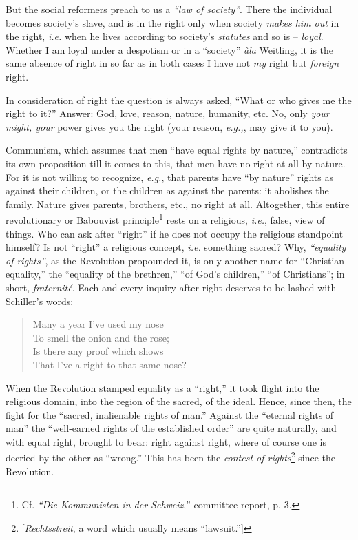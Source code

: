 \documentclass[12pt,a4paper]{book}
\begin{document}
But the social reformers preach to us a \textit{``law of society''}. There 
the individual becomes society's slave, and is in the right only when society 
\textit{makes him out} in the right, \textit{i.e.} when he lives according to 
society's \textit{statutes} and so is -- \textit{loyal}. Whether I am loyal 
under a despotism or in a ``society'' \textit{\`ala} Weitling, it is the 
same absence of right in so far as in both cases I have not \textit{my} right 
but \textit{foreign} right.

In consideration of right the question is always asked, ``What or who gives 
me the right to it?'' Answer: God, love, reason, nature, humanity, etc. No, 
only \textit{your might, your} power gives you the right (your reason, 
\textit{e.g.,}, may give it to you).

Communism, which assumes that men ``have equal rights by nature,'' 
contradicts its own proposition till it comes to this, that men have no right 
at all by nature. For it is not willing to recognize, \textit{e.g.}, that 
parents have ``by nature'' rights as against their children, or the children 
as against the parents: it abolishes the family. Nature gives parents, 
brothers, etc., no right at all. Altogether, this entire revolutionary or 
Babouvist principle\footnote{Cf. \textit{``Die Kommunisten in der 
Schweiz},'' committee report, p. 3.} rests on a religious, \textit{i.e.}, 
false, view of things. Who can ask after ``right'' if he does not occupy the 
religious standpoint himself? Is not ``right'' a religious concept, 
\textit{i.e.} something sacred? Why, \textit{``equality of rights''}, as the 
Revolution propounded it, is only another name for ``Christian equality,'' 
the ``equality of the brethren,'' ``of God's children,'' ``of 
Christians''; in short, \textit{fraternit\'e}. Each and every inquiry after 
right deserves to be lashed with Schiller's words:

\begin{quotation}

\noindent{} Many a year I've used my nose\\
 To smell the onion and the rose;\\
 Is there any proof which shows\\
 That I've a right to that same nose? \end{quotation}

\noindent{}When the Revolution stamped equality as a ``right,'' it took 
flight into the religious domain, into the region of the sacred, of the ideal. 
Hence, since then, the fight for the ``sacred, inalienable rights of man.'' 
Against the ``eternal rights of man'' the ``well-earned rights of the 
established order'' are quite naturally, and with equal right, brought to 
bear: right against right, where of course one is decried by the other as 
``wrong.'' This has been the \textit{contest of 
rights}\footnote{[\textit{Rechtsstreit}, a word which usually means 
``lawsuit.'']} since the Revolution.
\end{document}
